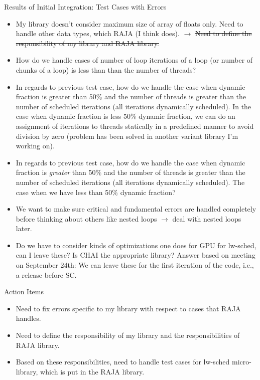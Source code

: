 \documentclass{beamer}
\begin{document}
\begin{frame}[allowframebreaks]{Results of Initial Integration: Test Cases with Errors}
\begin{itemize}
\small \item \small My library doesn't consider maximum size of array of floats only. Need to handle other data types, which RAJA (I think does). $\rightarrow$ \sout{Need to define the responsibility of my library and RAJA library.}
\item \small How do we handle cases of number of loop iterations of a loop (or number of chunks of a loop) is less than than the number of threads?
\item \small In regards to previous test case, how do we handle the case when dynamic fraction is greater than 50\% and the number of threads is greater than the number of scheduled iterations (all iterations dynamically scheduled). In the case when dynamic fraction is less 50\% dynamic fraction, we can do an assignment of iterations to threads statically in a predefined manner to avoid division by zero (problem has been solved in another variant library I'm working on).
\item \small In regards to previous test case, how do we handle the case when dynamic fraction is {\it greater} than 50\% and the number of threads is greater than the number of scheduled iterations (all iterations dynamically scheduled). The case when we have less than 50\% dynamic fraction?
\item \small We want to make sure critical and fundamental errors are handled completely before thinking about others like nested loops $\rightarrow$ deal with nested loops later. 
\item \small Do we have to consider kinds of optimizations one does for GPU for lw-sched, can I leave these? Is CHAI the appropriate library? Answer based on meeting on September 24th: We can leave these for the first iteration of the code, i.e., a release before SC.
\end{itemize}
\end{frame}

\begin{frame}{Action Items}
\begin{itemize}
\item Need to fix errors specific to my library with respect to cases that RAJA handles. 
\item Need to define the responsibility of my library and the responsibilities of RAJA library.
\item Based on these responsibilities, need to handle test cases for lw-sched micro-library, which is put in the RAJA library. 
\end{itemize}
\end{frame}
\end{document}
